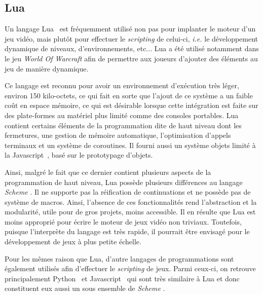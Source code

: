 \documentclass[12pt,twoside,letterpaper,francais]{book}
\newcommand{\ie}{{\textit{i.e. }}}
\newcommand{\Schemelang}{{\textit{Scheme }}}
\begin{document}
\FloatBarrier
\subsection{Lua}
Un langage Lua~\cite{Lua} est fréquemment utilisé non pas pour
implanter le moteur d'un jeu vidéo, mais plutôt pour effectuer le
\textit{scripting} de celui-ci, \ie le développement dynamique de
niveaux, d'environnements, etc... Lua a été utilisé notamment dans le
jeu \textit{World Of Warcraft} afin de permettre aux joueurs d'ajouter
des éléments au jeu de manière dynamique.

Ce langage est reconnu pour avoir un environnement d'exécution très
léger, environ 150 kilo-octets, ce qui fait en sorte que l'ajout de ce
système a un faible coût en espace mémoire, ce qui est désirable
lorsque cette intégration est faite sur des plate-formes au matériel
plus limité comme des consoles portables. Lua contient certains
éléments de la programmation dite de haut niveau dont les fermetures,
une gestion de mémoire automatique, l'optimisation d'appels terminaux
et un système de coroutines. Il fourni aussi un système objets limité
à la Javascript~\cite{ECMA-262}, basé sur le prototypage d'objets.

Ainsi, malgré le fait que ce dernier contient plusieurs aspects de la
programmation de haut niveau, Lua possède plusieurs différences au
langage \Schemelang. Il ne supporte pas la réification de
continuations et ne possède pas de système de macros. Ainsi, l'absence
de ces fonctionnalités rend l'abstraction et la modularité, utile pour
de gros projets, moins accessible. Il en résulte que Lua est moins
approprié pour écrire le moteur de jeux vidéo non triviaux. Toutefois,
puisque l'interprète du langage est très rapide, il pourrait être
envisagé pour le développement de jeux à plus petite échelle.

Pour les mêmes raison que Lua, d'autre langages de programmations sont
également utilisés afin d'effectuer le \textit{scripting} de
jeux. Parmi ceux-ci, on retrouve principalement Python~\cite{Python}
et Javascript~\cite{ECMA-262} qui sont très similaire à Lua et donc
constituent eux aussi un sous ensemble de \Schemelang.


\FloatBarrier
\end{document}
